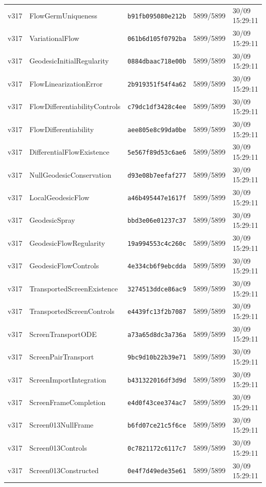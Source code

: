 \documentclass[11pt]{article}
\theoremstyle{definition}\newtheorem{deriv}{Derivation}
\begin{document}
{\begin{longtable}{@{}lllll@{}}
v317 & FlowGermUniqueness & \texttt{b91fb095080e212b} & 5899/5899 & 30/09 15:29:11 \\
v317 & VariationalFlow & \texttt{061b6d105f0792ba} & 5899/5899 & 30/09 15:29:11 \\
v317 & GeodesicInitialRegularity & \texttt{0884dbaac718e00b} & 5899/5899 & 30/09 15:29:11 \\
v317 & FlowLinearizationError & \texttt{2b919351f54f4a62} & 5899/5899 & 30/09 15:29:11 \\
v317 & FlowDifferentiabilityControls & \texttt{c79dc1df3428c4ee} & 5899/5899 & 30/09 15:29:11 \\
v317 & FlowDifferentiability & \texttt{aee805e8c99da0be} & 5899/5899 & 30/09 15:29:11 \\
v317 & DifferentialFlowExistence & \texttt{5e567f89d53c6ae6} & 5899/5899 & 30/09 15:29:11 \\
v317 & NullGeodesicConservation & \texttt{d93e08b7eefaf277} & 5899/5899 & 30/09 15:29:11 \\
v317 & LocalGeodesicFlow & \texttt{a46b495447e1617f} & 5899/5899 & 30/09 15:29:11 \\
v317 & GeodesicSpray & \texttt{bbd3e06e01237c37} & 5899/5899 & 30/09 15:29:11 \\
v317 & GeodesicFlowRegularity & \texttt{19a994553c4c260c} & 5899/5899 & 30/09 15:29:11 \\
v317 & GeodesicFlowControls & \texttt{4e334cb6f9ebcdda} & 5899/5899 & 30/09 15:29:11 \\
v317 & TransportedScreenExistence & \texttt{3274513ddce86ac9} & 5899/5899 & 30/09 15:29:11 \\
v317 & TransportedScreenControls & \texttt{e4439fc13f2b7087} & 5899/5899 & 30/09 15:29:11 \\
v317 & ScreenTransportODE & \texttt{a73a65d8dc3a736a} & 5899/5899 & 30/09 15:29:11 \\
v317 & ScreenPairTransport & \texttt{9bc9d10b22b39e71} & 5899/5899 & 30/09 15:29:11 \\
v317 & ScreenImportIntegration & \texttt{b431322016df3d9d} & 5899/5899 & 30/09 15:29:11 \\
v317 & ScreenFrameCompletion & \texttt{e4d0f43cee374ac7} & 5899/5899 & 30/09 15:29:11 \\
v317 & Screen013NullFrame & \texttt{b6fd07ce21c5f6ce} & 5899/5899 & 30/09 15:29:11 \\
v317 & Screen013Controls & \texttt{0c7821172c6117c7} & 5899/5899 & 30/09 15:29:11 \\
v317 & Screen013Constructed & \texttt{0e4f7d49ede35e61} & 5899/5899 & 30/09 15:29:11 \\

\end{longtable}}
\end{document}
